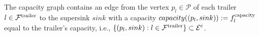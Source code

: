 The capacity graph  contains an edge from the vertex
$p_l \in \mathcal P$
of each trailer
$ l \in \mathcal F^{\rm trailer}$
to the supersink
$sink$
with a capacity
$ capacity((p_l ,sink)) := f^{\rm capacity}_l $
equal to the trailer's capacity,
i.e.,
$ \{ (p_l ,sink): l \in \mathcal F^{\rm trailer}  \} \subset \mathcal E^{\rm c}$.\\


